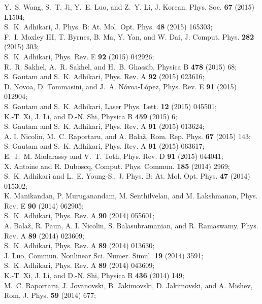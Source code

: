 \documentclass[onecolumn,3p]{elsarticle}
\begin{document}
\begin{thebibliography}{5}
Y.~S. Wang, S.~T. Ji, Y.~E. Luo, and Z.~Y. Li, J. Korean. Phys. Soc. {\bf 67} (2015) L1504;\\
S.~K. Adhikari, J. Phys. B: At. Mol. Opt. Phys. {\bf 48} (2015) 165303;\\
F.~I. Moxley III, T. Byrnes, B. Ma, Y. Yan, and W. Dai, J. Comput. Phys. {\bf 282} (2015) 303;\\
S.~K. Adhikari, Phys. Rev. E {\bf 92} (2015) 042926;\\
R.~R. Sakhel, A.~R. Sakhel, and H.~B. Ghassib, Physica B {\bf 478} (2015) 68;\\
S. Gautam and S.~K. Adhikari, Phys. Rev. A {\bf 92} (2015) 023616;\\
D. Novoa, D. Tommasini, and J.~A. N\'{o}voa-L\'{o}pez, Phys. Rev. E {\bf 91} (2015) 012904;\\
S. Gautam and S.~K. Adhikari, Laser Phys. Lett. {\bf 12} (2015) 045501;\\
K.-T. Xi, J. Li, and D.-N. Shi, Physica B {\bf 459} (2015) 6;\\
S. Gautam and S.~K. Adhikari, Phys. Rev. A {\bf 91} (2015) 013624;\\
A. I. Nicolin, M.~C. Raportaru, and A. Bala\v{z}, Rom. Rep. Phys. {\bf 67} (2015) 143;\\
S. Gautam and S.~K. Adhikari, Phys. Rev. A {\bf 91} (2015) 063617;\\
E.~J.~M. Madarassy and V.~T. Toth, Phys. Rev. D {\bf 91} (2015) 044041;\\
X. Antoine and R. Duboscq, Comput. Phys. Commun. {\bf 185} (2014) 2969;\\
S.~K. Adhikari and L.~E. Young-S., J. Phys. B: At. Mol. Opt. Phys. {\bf 47} (2014) 015302;\\
K. Manikandan, P. Muruganandam, M. Senthilvelan, and M. Lakshmanan, Phys. Rev. E {\bf 90} (2014) 062905;\\
S.~K. Adhikari, Phys. Rev. A {\bf 90} (2014) 055601;\\
A. Bala\v{z}, R. Paun, A. I. Nicolin, S. Balasubramanian, and R. Ramaswamy, Phys. Rev. A {\bf 89} (2014) 023609;\\
S.~K. Adhikari, Phys. Rev. A {\bf 89} (2014) 013630;\\
J. Luo, Commun. Nonlinear Sci. Numer. Simul. {\bf 19} (2014) 3591;\\
S.~K. Adhikari, Phys. Rev. A {\bf 89} (2014) 043609;\\
K.-T. Xi, J. Li, and D.-N. Shi, Physica B {\bf 436} (2014) 149;\\
M.~C. Raportaru, J. Jovanovski, B. Jakimovski, D. Jakimovski, and A. Mishev, Rom. J. Phys. {\bf 59} (2014) 677;\\

\end{thebibliography}
\end{document}
